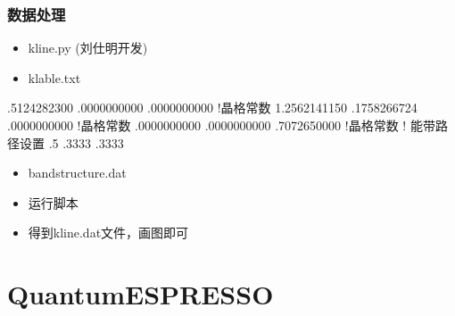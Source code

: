 \documentclass[a4paper,12pt,english]{sphinxmanual}
\begin{document}
\subsubsection{数据处理}
\label{\detokenize{tutorials/berkeleygw/gw:id2}}\begin{itemize}
\item {} 
\sphinxAtStartPar
kline.py (刘仕明开发)

\item {} 
\sphinxAtStartPar
klable.txt

\end{itemize}

\begin{sphinxVerbatim}[commandchars=\\\{\}]
 .5124282300       .0000000000       .0000000000 !晶格常数
\PYGZhy{}1.2562141150       .1758266724       .0000000000 !晶格常数
 .0000000000       .0000000000       .7072650000 !晶格常数
  ! 能带路径设置
               
 .5            
 .3333 .3333   
               
\end{sphinxVerbatim}
\begin{itemize}
\item {} 
\sphinxAtStartPar
bandstructure.dat

\item {} 
\sphinxAtStartPar
运行脚本

\end{itemize}

\begin{sphinxVerbatim}[commandchars=\\\{\}]
 
\end{sphinxVerbatim}
\begin{itemize}
\item {} 
\sphinxAtStartPar
得到kline.dat文件，画图即可

\end{itemize}


\section{Quantum\sphinxhyphen{}ESPRESSO}
\label{\detokenize{tutorial:quantum-espresso}}
\end{document}
